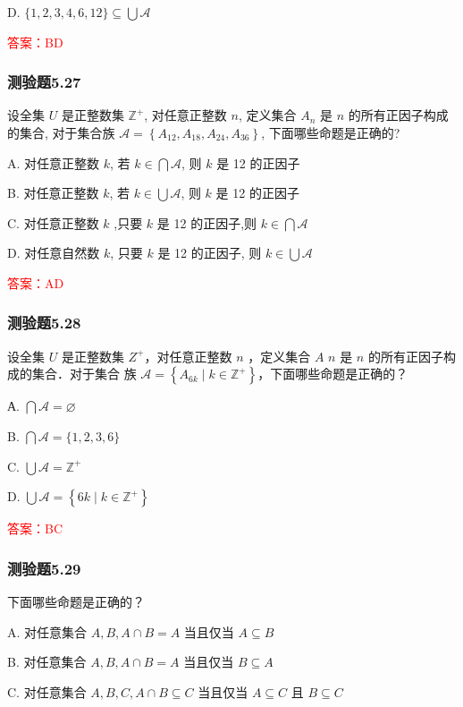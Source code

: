 \documentclass[UTF8, heading=true]{ctexart}
\begin{document}
D. $\{1,2,3,4,6,12\} \subseteq \bigcup \mathcal{A}$

\textcolor{red}{答案：BD}

\subsubsection{测验题5.27}

设全集 $U$ 是正整数集 $\mathbb{Z}^{+}$, 对任意正整数 $n$, 定义集合 $A_n$ 是 $n$ 的所有正因子构成的集合, 对于集合族 $\mathcal{A}=\left\{A_{12}, A_{18}, A_{24}, A_{36}\right\}$, 下面哪些命题是正确的?

A. 对任意正整数 $k$, 若 $k \in \bigcap \mathcal{A}$, 则 $k$ 是 12 的正因子

B. 对任意正整数 $k$, 若 $k \in \bigcup \mathcal{A}$, 则 $k$ 是 12 的正因子

C. 对任意正整数 $k$ ,只要 $k$ 是 12 的正因子,则 $k \in \bigcap \mathcal{A}$

D. 对任意自然数 $k$, 只要 $k$ 是 12 的正因子, 则 $k \in \bigcup \mathcal{A}$

\textcolor{red}{答案：AD}

\subsubsection{测验题5.28}

设全集 $U$ 是正整数集 $Z^{+}$，对任意正整数 $n$ ，定义集合 $A$ $n$ 是 $n$ 的所有正因子构成的集合．对于集合
族 $\mathcal{A}=\left\{A_{6 k} \mid k \in \mathbb{Z}^{+}\right\}$，下面哪些命题是正确的？

А. $\bigcap \mathcal{A}=\varnothing$

B. $\bigcap \mathcal{A}=\{1,2,3,6\}$

C. $\bigcup \mathcal{A}=\mathbb{Z}^{+}$

D. $\bigcup \mathcal{A}=\left\{6 k \mid k \in \mathbb{Z}^{+}\right\}$

\textcolor{red}{答案：BC}



\subsubsection{测验题5.29}
下面哪些命题是正确的？

A. 对任意集合 $A, B, A \cap B=A$ 当且仅当 $A \subseteq B$

B. 对任意集合 $A, B, A \cap B=A$ 当且仅当 $B \subseteq A$

C. 对任意集合 $A, B, C, A \cap B \subseteq C$ 当且仅当 $A \subseteq C$ 且 $B \subseteq C$
\end{document}
